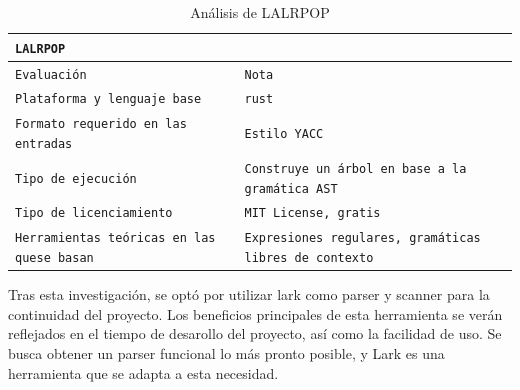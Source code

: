 \documentclass[12pt, letterpaper]{article}
\theoremstyle{definition}
\begin{document}
\begin{center}
\begin{longtable}{|p{3.5cm}|p{11cm}|}
    \caption{Análisis de LALRPOP} \\
    \hline
    \multicolumn{2}{|l|}{    \texttt{LALRPOP}     } \\
    \hline
    \texttt{Evaluación} & \texttt{Nota} \\
    \hline
    \endfirsthead
    \hline
    \endfoot
    \hline
    \endlastfoot
    \hline
    \texttt{Plataforma y lenguaje base}      & \texttt{rust}   \\ \hline
    \texttt{Formato requerido en las entradas}   & \texttt{Estilo YACC}                  \\ \hline
    \texttt{Tipo de ejecución}   & \texttt{Construye un árbol en base a la gramática AST} \\ \hline
    \texttt{Tipo de licenciamiento}   & \texttt{MIT License, gratis} \\ \hline
    \texttt{Herramientas teóricas en las quese basan}   & \texttt{Expresiones regulares, gramáticas libres de contexto} \\ \hline

\end{longtable}
\end{center}

Tras esta investigación, se optó por utilizar lark como parser y scanner para la continuidad del proyecto. Los beneficios principales de esta herramienta se verán reflejados en el tiempo de desarollo del proyecto, así como la facilidad de uso. Se busca obtener un parser funcional lo más pronto posible, y Lark es una herramienta que se adapta a esta necesidad.
\end{document}
